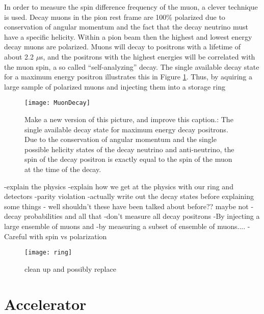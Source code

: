 In order to measure the spin difference frequency of the muon, a clever technique is used. Decay muons in the pion rest frame are 100\% polarized due to conservation of angular momentum and the fact that the decay neutrino must have a specific helicity. Within a pion beam then the highest and lowest energy decay muons are polarized. Muons will 
decay to positrons with a lifetime of about 2.2 $\mu$s, and the positrons with the highest energies will be correlated with the muon spin, a so called ``self-analyzing'' decay. The single available decay state for a maximum energy positron illustrates this in Figure \ref{fig:MuonDecay}. Thus, by aquiring a large sample of polarized muons and injecting them into a storage ring 

\begin{figure}[]
    \label{fig:MuonDecay}
	\centering
	\texttt{[image: MuonDecay]}
    \caption[Muon Decay - Max Energy Positron]{Make a new version of this picture, and improve this caption.: The single available decay state for maximum energy decay positrons. Due to the conservation of angular momentum and the single possible helicity states of the decay neutrino and anti-neutrino, the spin of the decay positron is exactly equal to the spin of the muon at the time of the decay.}
\end{figure}



-explain the physics
-explain how we get at the physics with our ring and detectors
-parity violation
-actually write out the decay states before explaining some things - well shouldn't these have been talked about before?? maybe not
-decay probabilities and all that
-don't measure all decay positrons
-By injecting a large ensemble of muons and 
-by measuring a subset of ensemble of muons....
-Careful with spin vs polarization





\begin{figure}[]
    \label{fig:ring}
    \centering
    \texttt{[image: ring]}
    \caption[ring]{clean up and possibly replace}   
\end{figure}


\section{Accelerator}
\label{sec:Accelerator}


\cite{Stratakis:2017uci}


